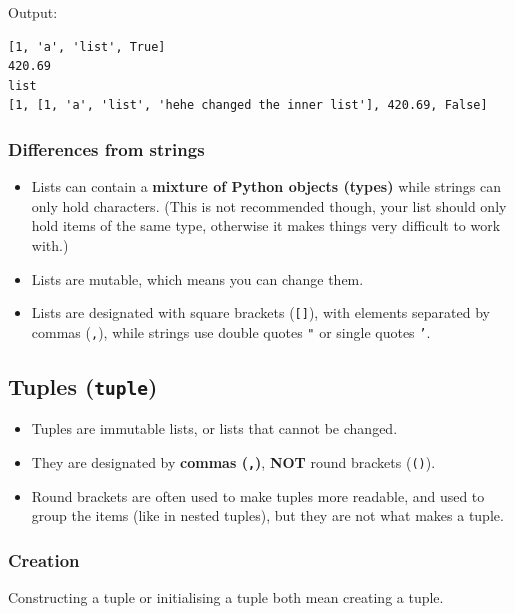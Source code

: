 \documentclass[11pt]{article}
\begin{document}
 \noindent Output:

\begin{verbatim}
[1, 'a', 'list', True]
420.69
list
[1, [1, 'a', 'list', 'hehe changed the inner list'], 420.69, False]
\end{verbatim}

\subsubsection{Differences from strings}
\label{sec:org8b8c45b}
\begin{itemize}
\item Lists can contain a \textbf{mixture of Python objects (types)} while strings can only hold characters. (This is not recommended though, your list should only hold items of the same type, otherwise it makes things very difficult to work with.)
\item Lists are mutable, which means you can change them.
\item Lists are designated with square brackets (\texttt{[]}), with elements separated by commas (\texttt{,}), while strings use double quotes \texttt{"} or single quotes \texttt{'}.
\end{itemize}

\subsection{Tuples (\texttt{tuple})}
\label{sec:orgf392c3a}
\begin{itemize}
\item Tuples are immutable lists, or lists that cannot be changed.
\item They are designated by \textbf{commas (\texttt{,})}, \textbf{NOT} round brackets (\texttt{()}).
\item Round brackets are often used to make tuples more readable, and used to group the items (like in nested tuples), but they are not what makes a tuple.
\end{itemize}

\subsubsection{Creation}
\label{sec:orgedd9c6f}
Constructing a tuple or initialising a tuple both mean creating a tuple.
\end{document}
